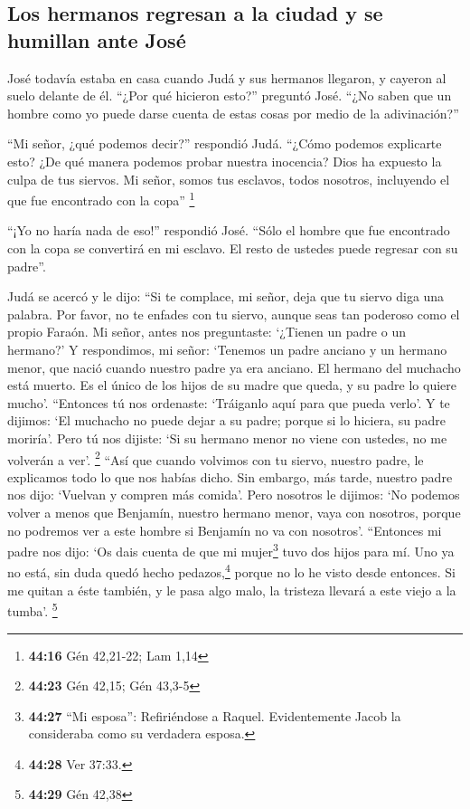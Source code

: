 \hypertarget{los-hermanos-regresan-a-la-ciudad-y-se-humillan-ante-josuxe9}{%
\subsection{Los hermanos regresan a la ciudad y se humillan ante
José}\label{los-hermanos-regresan-a-la-ciudad-y-se-humillan-ante-josuxe9}}

 José todavía estaba en casa cuando Judá y sus hermanos
llegaron, y cayeron al suelo delante de él.  ``¿Por qué
hicieron esto?'' preguntó José. ``¿No saben que un hombre como yo puede
darse cuenta de estas cosas por medio de la adivinación?''

 ``Mi señor, ¿qué podemos decir?'' respondió Judá.
``¿Cómo podemos explicarte esto? ¿De qué manera podemos probar nuestra
inocencia? Dios ha expuesto la culpa de tus siervos. Mi señor, somos tus
esclavos, todos nosotros, incluyendo el que fue encontrado con la copa''
\footnote{\textbf{44:16} Gén 42,21-22; Lam 1,14}

 ``¡Yo no haría nada de eso!'' respondió José. ``Sólo el
hombre que fue encontrado con la copa se convertirá en mi esclavo. El
resto de ustedes puede regresar con su padre''.

 Judá se acercó y le dijo: ``Si te complace, mi señor,
deja que tu siervo diga una palabra. Por favor, no te enfades con tu
siervo, aunque seas tan poderoso como el propio Faraón. 
Mi señor, antes nos preguntaste: `¿Tienen un padre o un hermano?'
 Y respondimos, mi señor: `Tenemos un padre anciano y un
hermano menor, que nació cuando nuestro padre ya era anciano. El hermano
del muchacho está muerto. Es el único de los hijos de su madre que
queda, y su padre lo quiere mucho'.  ``Entonces tú nos
ordenaste: `Tráiganlo aquí para que pueda verlo'.  Y te
dijimos: `El muchacho no puede dejar a su padre; porque si lo hiciera,
su padre moriría'.  Pero tú nos dijiste: `Si su hermano
menor no viene con ustedes, no me volverán a ver'. \footnote{\textbf{44:23}
  Gén 42,15; Gén 43,3-5}  ``Así que cuando volvimos con
tu siervo, nuestro padre, le explicamos todo lo que nos habías dicho.
 Sin embargo, más tarde, nuestro padre nos dijo: `Vuelvan
y compren más comida'.  Pero nosotros le dijimos: `No
podemos volver a menos que Benjamín, nuestro hermano menor, vaya con
nosotros, porque no podremos ver a este hombre si Benjamín no va con
nosotros'.  ``Entonces mi padre nos dijo: `Os dais cuenta
de que mi mujer\footnote{\textbf{44:27} ``Mi esposa'': Refiriéndose a
  Raquel. Evidentemente Jacob la consideraba como su verdadera esposa.}
tuvo dos hijos para mí.  Uno ya no está, sin duda quedó
hecho pedazos,\footnote{\textbf{44:28} Ver 37:33.} porque no lo he visto
desde entonces.  Si me quitan a éste también, y le pasa
algo malo, la tristeza llevará a este viejo a la tumba'. \footnote{\textbf{44:29}
  Gén 42,38}

